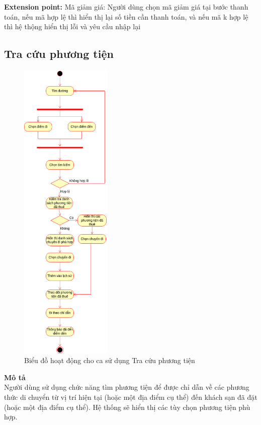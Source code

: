 \textbf{Extension point:} Mã giảm giá: Người dùng chọn mã giảm giá tại bước thanh toán, nếu mã hợp lệ thì hiển thị lại số tiền cần thanh toán, và nếu mã k hợp lệ thì hệ thộng hiển thị lỗi và yêu cầu nhập lại

\subsection{Tra cứu phương tiện}
\begin{figure}[H]
    \centering
    \includegraphics[width=0.39\textwidth]{img/1.5 Minh-Tìm phương tiện.drawio.png}
    \caption{Biểu đồ hoạt động cho ca sử dụng Tra cứu phương tiện}
\end{figure}
\textbf{\indent Mô tả}\\
\indent Người dùng sử dụng chức năng tìm phương tiện để được chỉ dẫn về các phương thức di chuyển từ vị trí hiện tại (hoặc một địa điểm cụ thể) đến khách sạn đã đặt (hoặc một địa điểm cụ thể). Hệ thống sẽ hiển thị các tùy chọn phương tiện phù hợp.

